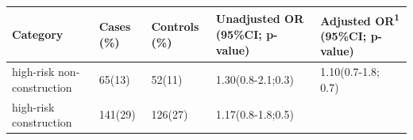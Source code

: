\documentclass[
]{article}
\begin{document}
\begin{longtable}[]{@{}lllll@{}}
\toprule
\begin{minipage}[b]{0.20\columnwidth}\raggedright
Category\strut
\end{minipage} & \begin{minipage}[b]{0.08\columnwidth}\raggedright
Cases (\%)\strut
\end{minipage} & \begin{minipage}[b]{0.10\columnwidth}\raggedright
Controls (\%)\strut
\end{minipage} & \begin{minipage}[b]{0.24\columnwidth}\raggedright
Unadjusted OR (95\%CI; p-value)\strut
\end{minipage} & \begin{minipage}[b]{0.23\columnwidth}\raggedright
Adjusted OR\textsuperscript{1} (95\%CI; p-value)\strut
\end{minipage}\tabularnewline
\midrule
\endhead
\begin{minipage}[t]{0.20\columnwidth}\raggedright
high-risk non-construction\strut
\end{minipage} & \begin{minipage}[t]{0.08\columnwidth}\raggedright
65(13)\strut
\end{minipage} & \begin{minipage}[t]{0.10\columnwidth}\raggedright
52(11)\strut
\end{minipage} & \begin{minipage}[t]{0.24\columnwidth}\raggedright
1.30(0.8-2.1;0.3)\strut
\end{minipage} & \begin{minipage}[t]{0.23\columnwidth}\raggedright
1.10(0.7-1.8; 0.7)\strut
\end{minipage}\tabularnewline
\begin{minipage}[t]{0.20\columnwidth}\raggedright
high-risk construction\strut
\end{minipage} & \begin{minipage}[t]{0.08\columnwidth}\raggedright
141(29)\strut
\end{minipage} & \begin{minipage}[t]{0.10\columnwidth}\raggedright
126(27)\strut
\end{minipage} & \begin{minipage}[t]{0.24\columnwidth}\raggedright
1.17(0.8-1.8;0.5)\strut
\end{minipage} & \begin{minipage}[t]{0.23\columnwidth}\raggedright

\end{minipage}
\end{longtable}
\end{document}
